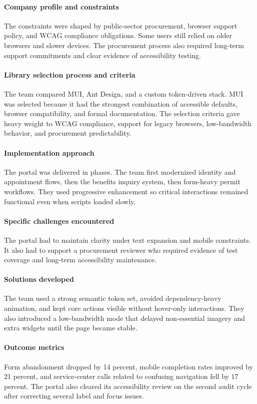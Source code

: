 \paragraph{Company profile and constraints}
The constraints were shaped by public-sector procurement, browser support policy, and WCAG compliance obligations. Some users still relied on older browsers and slower devices. The procurement process also required long-term support commitments and clear evidence of accessibility testing.

\paragraph{Library selection process and criteria}
The team compared MUI, Ant Design, and a custom token-driven stack. MUI was selected because it had the strongest combination of accessible defaults, browser compatibility, and formal documentation. The selection criteria gave heavy weight to WCAG compliance, support for legacy browsers, low-bandwidth behavior, and procurement predictability.

\paragraph{Implementation approach}
The portal was delivered in phases. The team first modernized identity and appointment flows, then the benefits inquiry system, then form-heavy permit workflows. They used progressive enhancement so critical interactions remained functional even when scripts loaded slowly.

\paragraph{Specific challenges encountered}
The portal had to maintain clarity under text expansion and mobile constraints. It also had to support a procurement reviewer who required evidence of test coverage and long-term accessibility maintenance.

\paragraph{Solutions developed}
The team used a strong semantic token set, avoided dependency-heavy animation, and kept core actions visible without hover-only interactions. They also introduced a low-bandwidth mode that delayed non-essential imagery and extra widgets until the page became stable.

\paragraph{Outcome metrics}
Form abandonment dropped by 14 percent, mobile completion rates improved by 21 percent, and service-center calls related to confusing navigation fell by 17 percent. The portal also cleared its accessibility review on the second audit cycle after correcting several label and focus issues.

